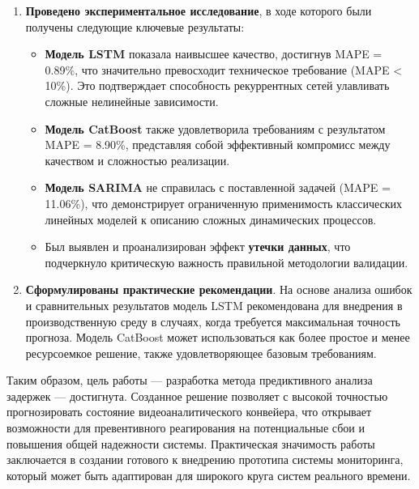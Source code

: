 \begin{enumerate}
    \item \textbf{Проведено экспериментальное исследование}, в ходе которого были получены следующие ключевые результаты:
    \begin{itemize}
        \item \textbf{Модель LSTM} показала наивысшее качество, достигнув MAPE = 0.89\%, что значительно превосходит техническое требование (MAPE < 10\%). Это подтверждает способность рекуррентных сетей улавливать сложные нелинейные зависимости.
        \item \textbf{Модель CatBoost} также удовлетворила требованиям с результатом MAPE = 8.90\%, представляя собой эффективный компромисс между качеством и сложностью реализации.
        \item \textbf{Модель SARIMA} не справилась с поставленной задачей (MAPE = 11.06\%), что демонстрирует ограниченную применимость классических линейных моделей к описанию сложных динамических процессов.
        \item Был выявлен и проанализирован эффект \textbf{утечки данных}, что подчеркнуло критическую важность правильной методологии валидации.
    \end{itemize}

    \item \textbf{Сформулированы практические рекомендации}. На основе анализа ошибок и сравнительных результатов модель LSTM рекомендована для внедрения в производственную среду в случаях, когда требуется максимальная точность прогноза. Модель CatBoost может использоваться как более простое и менее ресурсоемкое решение, также удовлетворяющее базовым требованиям.
\end{enumerate}

\hspace*{1.25cm}Таким образом, цель работы — разработка метода предиктивного анализа задержек — достигнута. Созданное решение позволяет с высокой точностью прогнозировать состояние видеоаналитического конвейера, что открывает возможности для превентивного реагирования на потенциальные сбои и повышения общей надежности системы. Практическая значимость работы заключается в создании готового к внедрению прототипа системы мониторинга, который может быть адаптирован для широкого круга систем реального времени.

